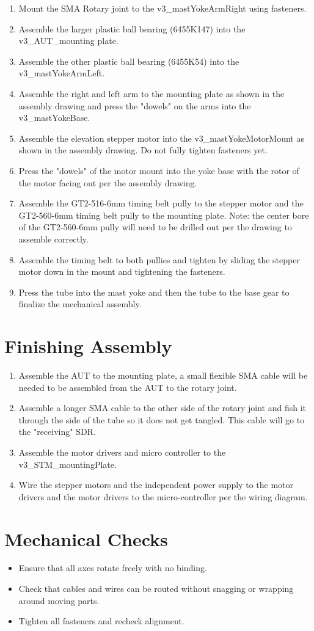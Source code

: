 \begin{enumerate}
  \item Mount the SMA Rotary joint to the v3\_mastYokeArmRight using fasteners.
  \item Assemble the larger plastic ball bearing (6455K147) into the v3\_AUT\_mounting plate.
  \item Assemble the other plastic ball bearing (6455K54) into the v3\_mastYokeArmLeft.
  \item Assemble the right and left arm to the mounting plate as shown in the assembly drawing and press the "dowels" on the arms into the v3\_mastYokeBase.
  \item Assemble the elevation stepper motor into the v3\_mastYokeMotorMount as shown in the assembly drawing. Do not fully tighten fasteners yet.
  \item Press the "dowels" of the motor mount into the yoke base with the rotor of the motor facing out per the assembly drawing.
  \item Assemble the GT2-516-6mm timing belt pully to the stepper motor and the GT2-560-6mm timing belt pully to the mounting plate. Note: the center bore of the GT2-560-6mm pully will need to be drilled out per the drawing to assemble correctly. 
  \item Assemble the timing belt to both pullies and tighten by sliding the stepper motor down in the mount and tightening the fasteners. 
  \item Press the tube into the mast yoke and then the tube to the base gear to finalize the mechanical assembly.
\end{enumerate}

\section{Finishing Assembly}

\begin{enumerate}
  \item Assemble the AUT to the mounting plate, a small flexible SMA cable will be needed to be assembled from the AUT to the rotary joint. 
  \item Assemble a longer SMA cable to the other side of the rotary joint and fish it through the side of the tube so it does not get tangled. This cable will go to the "receiving" SDR. 
  \item Assemble the motor drivers and micro controller to the v3\_STM\_mountingPlate.
  \item Wire the stepper motors and the independent power supply to the motor drivers and the motor drivers to the micro-controller per the wiring diagram. 
\end{enumerate}

\section{Mechanical Checks}

\begin{itemize}
  \item Ensure that all axes rotate freely with no binding.
  \item Check that cables and wires can be routed without snagging or wrapping around moving parts.
  \item Tighten all fasteners and recheck alignment.
\end{itemize}
